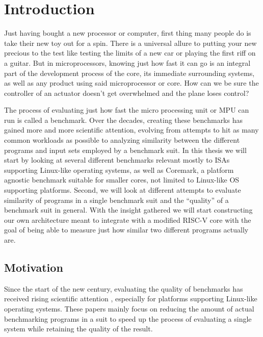 \documentclass[../bachelor_paper.tex]{subfiles}
\begin{document}
\chapter{Introduction}
    \label{ch:intro}

Just having bought a new processor or computer, first thing many people do is take their new toy out for a spin. There is a universal allure to putting your new precious to the test like testing the limits of a new car or playing the first riff on a guitar. But in microprocessors, knowing just how fast it can go is an integral part of the development process of the core, its immediate surrounding systems, as well as any product using said microprocessor or core. How can we be sure the controller of an actuator doesn't get overwhelmed and the plane loses control?

The process of evaluating just how fast the micro processing unit or \acs{MPU} can run is called a benchmark. Over the decades, creating these benchmarks has gained more and more scientific attention, evolving from attempts to hit as many common workloads as possible to analyzing similarity between the different programs and input sets employed by a benchmark suit. In this thesis we will start by looking at several different benchmarks relevant mostly to \acs{ISA}s supporting Linux-like operating systems, as well as Coremark\cite{gal-onExploringCoremarkBenchmark2012}, a platform agnostic benchmark suitable for smaller cores, not limited to Linux-like \acs{OS} supporting platforms. Second, we will look at different attempts to evaluate similarity of programs in a single benchmark suit and the ``quality'' of a benchmark suit in general. With the insight gathered we will start constructing our own architecture meant to integrate with a modified RISC-V core with the goal of being able to measure just how similar two different programs actually are.

\section{Motivation}
Since the start of the new century, evaluating the quality of benchmarks has received rising scientific attention \cite{eeckhoutDesigningComputerArchitecture2003,dujmovicEvolutionEvaluationSPEC1998,vandierendonckManyBenchmarksStress,phansalkarMeasuringProgramSimilarity2005,eeckhoutQuantifyingImpactInput}, especially for platforms supporting Linux-like operating systems. These papers mainly focus on reducing the amount of actual benchmarking programs in a suit to speed up the process of evaluating a single system while retaining the quality of the result. 
\end{document}
